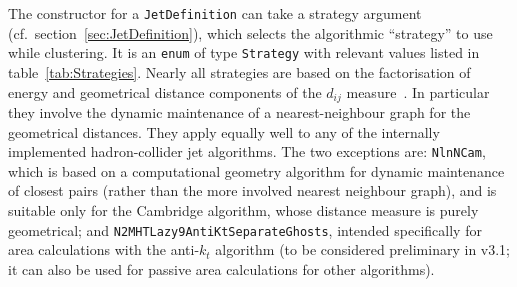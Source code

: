 \documentclass[12pt,a4]{article}
\newcommand{\ttt}[1]{{\small\texttt{#1}}}
\begin{document}
The constructor for a \ttt{JetDefinition} can take a strategy argument
(cf.\ section~\ref{sec:JetDefinition}), which selects the algorithmic
``strategy'' to use while clustering.
%
It is an \ttt{enum} of type \ttt{Strategy} with relevant
values listed in table~\ref{tab:Strategies}.
%
Nearly all strategies are based on the factorisation of energy and
geometrical distance components of the $d_{ij}$
measure~\cite{fastjet}. In particular they involve the dynamic
maintenance of a nearest-neighbour graph for the geometrical
distances.  They apply equally well to any of the internally
implemented hadron-collider jet algorithms.
%
The two exceptions are: \ttt{NlnNCam}, which is based on a
computational geometry algorithm for dynamic maintenance of closest
pairs \cite{Chan} (rather than the more involved nearest neighbour
graph), and is suitable only for the Cambridge algorithm, whose
distance measure is purely geometrical; and
\ttt{N2MHTLazy9AntiKtSeparateGhosts}, intended specifically for area
calculations with the anti-$k_t$ algorithm (to be considered
preliminary in v3.1; it can also be used for passive area calculations
for other algorithms).
\end{document}
